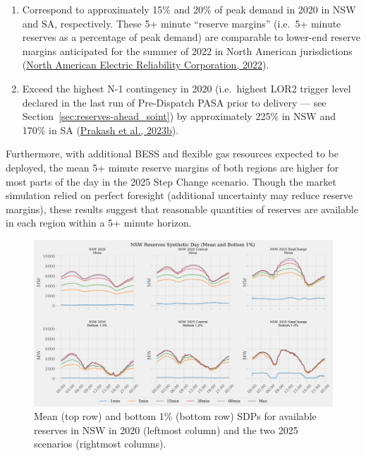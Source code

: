 \documentclass[12pt,a4paper,]{report}
\providecommand{\tightlist}{%
  \setlength{\itemsep}{0pt}\setlength{\parskip}{0pt}}
\begin{document}
\begin{enumerate}
\def\labelenumi{\arabic{enumi}.}
\tightlist
\item
  Correspond to approximately 15\% and 20\% of peak demand in 2020 in
  NSW and SA, respectively. These 5+ minute ``reserve margins'' (i.e.~5+
  minute reserves as a percentage of peak demand) are comparable to
  lower-end reserve margins anticipated for the summer of 2022 in North
  American jurisdictions
  (\protect\hyperlink{ref-northamericanelectricreliabilitycorporation2022SummerReliability2022}{North
  American Electric Reliability Corporation, 2022}).
\item
  Exceed the highest N-1 contingency in 2020 (i.e.~highest LOR2 trigger
  level declared in the last run of Pre-Dispatch PASA prior to delivery
  --- see Section~\ref{sec:reserves-ahead_soint}) by approximately 225\%
  in NSW and 170\% in SA
  (\protect\hyperlink{ref-prakashNEMSEERPythonPackage2023}{Prakash et
  al., 2023b}).
\end{enumerate}

Furthermore, with additional BESS and flexible gas resources expected to
be deployed, the mean 5+ minute reserve margins of both regions are
higher for most parts of the day in the 2025 Step Change scenario.
Though the market simulation relied on perfect foresight (additional
uncertainty may reduce reserve margins), these results suggest that
reasonable quantities of reserves are available in each region within a
5+ minute horizon.

\begin{figure}
\hypertarget{fig:nswreserves}{%
\centering
\includegraphics[width=1\textwidth,height=\textheight]{./source/figures/NSW_reserves_all_profiles_by_di.png}
\caption[NSW available reserves SDPs]{Mean (top row) and bottom 1\%
(bottom row) SDPs for available reserves in NSW in 2020 (leftmost
column) and the two 2025 scenarios (rightmost
columns).}\label{fig:nswreserves}
}
\end{figure}
\end{document}
